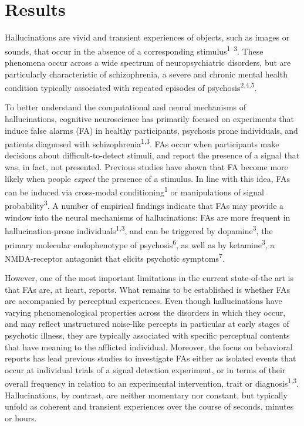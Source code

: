 \documentclass[
]{article}
\begin{document}
\hypertarget{results}{%
\section{Results}\label{results}}

Hallucinations are vivid and transient experiences of objects, such as
images or sounds, that occur in the absence of a corresponding
stimulus\textsuperscript{1--3}. These phenomena occur across a wide
spectrum of neuropsychiatric disorders, but are particularly
characteristic of schizophrenia, a severe and chronic mental health
condition typically associated with repeated episodes of
psychosis\textsuperscript{2,4,5}.

To better understand the computational and neural mechanisms of
hallucinations, cognitive neuroscience has primarily focused on
experiments that induce false alarms (FA) in healthy participants,
psychosis prone individuals, and patients diagnosed with
schizophrenia\textsuperscript{1,3}. FAs occur when participants make
decisions about difficult-to-detect stimuli, and report the presence of
a signal that was, in fact, not presented. Previous studies have shown
that FA become more likely when people \emph{expect} the presence of a
stimulus. In line with this idea, FAs can be induced via cross-modal
conditioning\textsuperscript{1} or manipulations of signal
probability\textsuperscript{3}. A number of empirical findings indicate
that FAs may provide a window into the neural mechanisms of
hallucinations: FAs are more frequent in hallucination-prone
individuals\textsuperscript{1,3}, and can be triggered by
dopamine\textsuperscript{3}, the primary molecular endophenotype of
psychosis\textsuperscript{6}, as well as by ketamine\textsuperscript{3},
a NMDA-receptor antagonist that elicits psychotic
symptoms\textsuperscript{7}.

However, one of the most important limitations in the current
state-of-the art is that FAs are, at heart, reports. What remains to be
established is whether FAs are accompanied by perceptual experiences.
Even though hallucinations have varying phenomenological properties
across the disorders in which they occur, and may reflect unstructured
noise-like percepts in particular at early stages of psychotic illness,
they are typically associated with specific perceptual contents that
have meaning to the afflicted individual. Moreover, the focus on
behavioral reports has lead previous studies to investigate FAs either
as isolated events that occur at individual trials of a signal detection
experiment, or in terms of their overall frequency in relation to an
experimental intervention, trait or diagnosis\textsuperscript{1,3}.
Hallucinations, by contrast, are neither momentary nor constant, but
typically unfold as coherent and transient experiences over the course
of seconds, minutes or hours.
\end{document}
